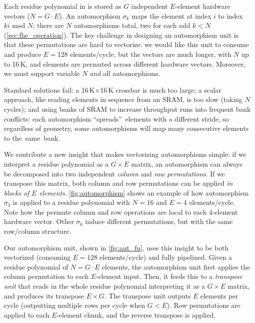 Each residue polynomial in \name is stored as $G$ independent $E$-element hardware vectors ($N=G\cdot E$).
An automorphism $\sigma_k$ maps the element at index $i$ to index $ki \textrm{ mod } N$;
there are $N$ automorphisms total, two for each odd $k < N$ (\autoref{sec:fhe_operation}).
The key challenge in designing an automorphism unit is that these permutations are hard to vectorize:
we would like this unit to consume and produce $E=$128 elements/cycle, but the vectors
are much longer, with $N$ up to 16\,K, and elements are permuted across different hardware vectors.
Moreover, we must support variable $N$ \emph{and} all automorphisms.

Standard solutions fail: a 16\,K$\times$16\,K crossbar is much too large;
a scalar approach, like reading elements in sequence from an SRAM, is too slow (taking $N$ cycles);
and using banks of SRAM to increase throughput runs into frequent bank conflicts:
each automorphism ``spreads''~elements with a different stride, so regardless of geometry,
some automorphisms will map many consecutive elements to the~same~bank.

\figAutomorphism

We contribute a new insight that makes vectorizing automorphisms simple:
if we interpret a residue polynomial as a $G \times E$ matrix,
an automorphism can always be decomposed into two independent \emph{column} and \emph{row permutations}.
If we transpose this matrix, both column and row permutations can 
be applied \emph{in blocks of $E$ elements}. \autoref{fig:automorphism} shows an example 
of how automorphism $\sigma_3$ is applied to a residue polynomial
with $N=16$ and $E=4$ elements/cycle.
Note how the permute column and row operations are local to each $4$-element hardware vector.
Other $\sigma_k$ induce different permutations, but with the same row/column structure.



Our automorphism unit, shown in \autoref{fig:aut_fu},
uses this insight to be both vectorized (consuming $E=128$ elements/cycle) and fully pipelined.
Given a residue polynomial of $N=G\cdot E$ elements, the automorphism unit first applies the column permutation
to each $E$-element input.
Then, it feeds this to a \emph{transpose unit} that reads in the whole residue polynomial interpreting it as a $G\times E$ matrix,
and produces its transpose $E\times G$.
The transpose unit outputs $E$ elements per cycle (outputting multiple rows per cycle when $G < E$).
Row permutations are applied to each $E$-element chunk, and the reverse transpose is applied.

